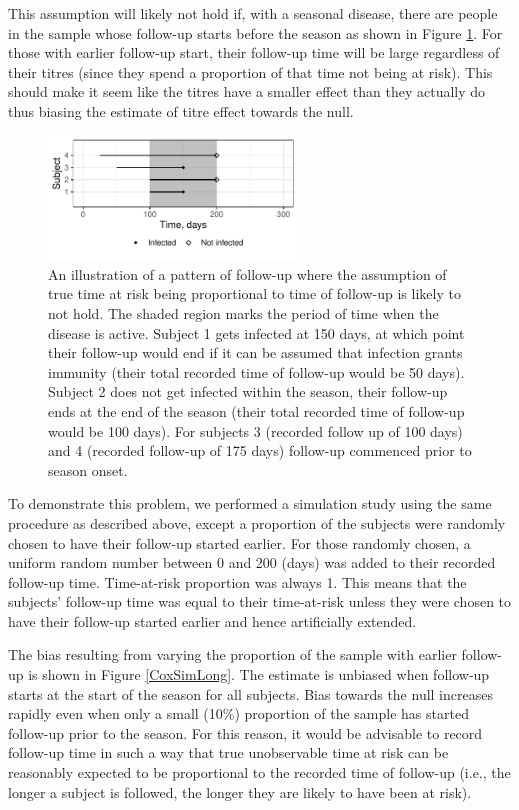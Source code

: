This assumption will likely not hold if, with a seasonal disease, there are people in the sample whose follow-up starts before the season as shown in Figure \ref{CoxNotIdeal}. For those with earlier follow-up start, their follow-up time will be large regardless of their titres (since they spend a proportion of that time not being at risk). This should make it seem like the titres have a smaller effect than they actually do thus biasing the estimate of titre effect towards the null.

\begin{figure}[htp]
	\centering
	\includegraphics[width=0.59\textwidth]{../curve-cox/timeplot_4_light.pdf}
	\caption{
		An illustration of a pattern of follow-up where the assumption of true time at risk being proportional to time of follow-up is likely to not hold. The shaded region marks the period of time when the disease is active. Subject 1 gets infected at 150 days, at which point their follow-up would end if it can be assumed that infection grants immunity (their total recorded time of follow-up would be 50 days). Subject 2 does not get infected within the season, their follow-up ends at the end of the season (their total recorded time of follow-up would be 100 days). For subjects 3 (recorded follow up of 100 days) and 4 (recorded follow-up of 175 days) follow-up commenced prior to season onset.
	}
	\label{CoxNotIdeal}
\end{figure}

To demonstrate this problem, we performed a simulation study using the same procedure as described above, except a proportion of the subjects were randomly chosen to have their follow-up started earlier. For those randomly chosen, a uniform random number between 0 and 200 (days) was added to their recorded follow-up time. Time-at-risk proportion was always 1. This means that the subjects' follow-up time was equal to their time-at-risk unless they were chosen to have their follow-up started earlier and hence artificially extended.

The bias resulting from varying the proportion of the sample with earlier follow-up is shown in Figure \ref{CoxSimLong}. The estimate is unbiased when follow-up starts at the start of the season for all subjects. Bias towards the null increases rapidly even when only a small (10\%) proportion of the sample has started follow-up prior to the season. For this reason, it would be advisable to record follow-up time in such a way that true unobservable time at risk can be reasonably expected to be proportional to the recorded time of follow-up (i.e., the longer a subject is followed, the longer they are likely to have been at risk).

